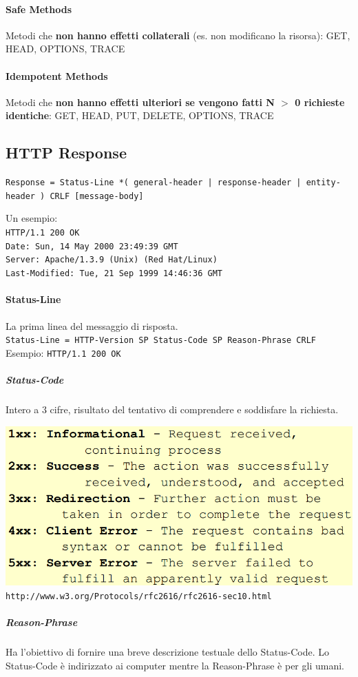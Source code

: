 \documentclass[10pt]{article}
\begin{document}
\begin{list}{}{}
\paragraph{Safe Methods} Metodi che \textbf{non hanno effetti collaterali} (es. non modificano la risorsa): GET, HEAD, OPTIONS, TRACE
\paragraph{Idempotent Methods} Metodi che \textbf{non hanno effetti ulteriori se vengono fatti N $>$ 0 richieste identiche}: GET, HEAD, PUT, DELETE, OPTIONS, TRACE
\end{list}
\pagebreak
\subsection{HTTP Response}
\begin{center}
\texttt{Response = Status-Line *( general-header | response-header | entity-header ) CRLF [message-body]}
\end{center}
Un esempio:\\
\texttt{HTTP/1.1 200 OK\\
Date: Sun, 14 May 2000 23:49:39 GMT\\
Server: Apache/1.3.9 (Unix) (Red Hat/Linux)\\
Last-Modified: Tue, 21 Sep 1999 14:46:36 GMT}\\
\paragraph{Status-Line} La prima linea del messaggio di risposta.\\
\texttt{Status-Line = HTTP-Version SP Status-Code SP Reason-Phrase CRLF}\\Esempio: \texttt{HTTP/1.1 200 OK}
\subparagraph{Status-Code} Intero a 3 cifre, risultato del tentativo di comprendere e soddisfare la richiesta.\\\begin{center}
\includegraphics[scale=0.5]{httpresponsecode.png}\\\texttt{http://www.w3.org/Protocols/rfc2616/rfc2616-sec10.html}
\end{center}
\subparagraph{Reason-Phrase} Ha l'obiettivo di fornire una breve descrizione testuale dello Status-Code. Lo Status-Code è indirizzato ai computer mentre la Reason-Phrase è per gli umani.
\end{document}
